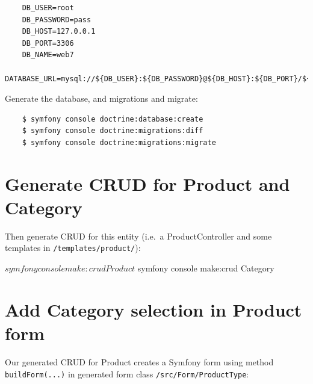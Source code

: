 \documentclass[a4paperpaper,openright]{book}
\newenvironment{Shaded}{}{}
\newcommand{\ExtensionTok}[1]{#1}
\newcommand{\KeywordTok}[1]{\textcolor[rgb]{0.00,0.44,0.13}{\textbf{#1}}}
\newcommand{\NormalTok}[1]{#1}
\newcommand{\OtherTok}[1]{\textcolor[rgb]{0.00,0.44,0.13}{#1}}
\newcommand{\StringTok}[1]{\textcolor[rgb]{0.25,0.44,0.63}{#1}}
\begin{document}
\begin{verbatim}
    DB_USER=root
    DB_PASSWORD=pass
    DB_HOST=127.0.0.1
    DB_PORT=3306
    DB_NAME=web7
    DATABASE_URL=mysql://${DB_USER}:${DB_PASSWORD}@${DB_HOST}:${DB_PORT}/${DB_NAME}
\end{verbatim}

Generate the database, and migrations and migrate:

\begin{verbatim}
    $ symfony console doctrine:database:create
    $ symfony console doctrine:migrations:diff
    $ symfony console doctrine:migrations:migrate
\end{verbatim}

\hypertarget{generate-crud-for-product-and-category}{%
\section{Generate CRUD for Product and
Category}\label{generate-crud-for-product-and-category}}

Then generate CRUD for this entity (i.e.~a ProductController and some
templates in \texttt{/templates/product/}):

\begin{Shaded}
\begin{Highlighting}[]
\NormalTok{    $ }\ExtensionTok{symfony}\NormalTok{ console make:crud Product}
\NormalTok{    $ }\ExtensionTok{symfony}\NormalTok{ console make:crud Category}
\end{Highlighting}
\end{Shaded}

\hypertarget{add-category-selection-in-product-form}{%
\section{Add Category selection in Product
form}\label{add-category-selection-in-product-form}}

Our generated CRUD for Product creates a Symfony form using method
\texttt{buildForm(...)} in generated form class
\texttt{/src/Form/ProductType}:

\begin{Shaded}
\end{Shaded}
\end{document}
